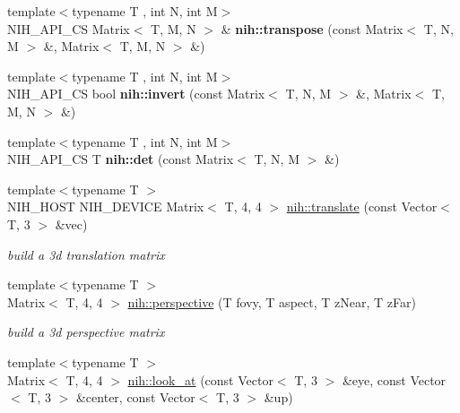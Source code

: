 \begin{DoxyCompactItemize}
\item 
\hypertarget{group__matrices_ga317a79a13fca76856e3c4500ec8eeffa}{
{\footnotesize template$<$typename T , int \-N, int \-M$>$ }\\\-N\-I\-H\-\_\-\-A\-P\-I\-\_\-\-C\-S \-Matrix$<$ \-T, \-M, \-N $>$ \& {\bfseries nih\-::transpose} (const \-Matrix$<$ \-T, \-N, \-M $>$ \&, \-Matrix$<$ \-T, \-M, \-N $>$ \&)}
\label{group__matrices_ga317a79a13fca76856e3c4500ec8eeffa}

\item 
\hypertarget{group__matrices_ga0f2181373ff7ef8ed392ccf8f92b8b97}{
{\footnotesize template$<$typename T , int \-N, int \-M$>$ }\\\-N\-I\-H\-\_\-\-A\-P\-I\-\_\-\-C\-S bool {\bfseries nih\-::invert} (const \-Matrix$<$ \-T, \-N, \-M $>$ \&, \-Matrix$<$ \-T, \-M, \-N $>$ \&)}
\label{group__matrices_ga0f2181373ff7ef8ed392ccf8f92b8b97}

\item 
\hypertarget{group__matrices_ga23f8ea3658a91f52bf853a4865f7df80}{
{\footnotesize template$<$typename T , int \-N, int \-M$>$ }\\\-N\-I\-H\-\_\-\-A\-P\-I\-\_\-\-C\-S \-T {\bfseries nih\-::det} (const \-Matrix$<$ \-T, \-N, \-M $>$ \&)}
\label{group__matrices_ga23f8ea3658a91f52bf853a4865f7df80}

\item 
\hypertarget{group__matrices_ga5d92f3307949b63085b54c2c4d14cb78}{
{\footnotesize template$<$typename T $>$ }\\\-N\-I\-H\-\_\-\-H\-O\-S\-T \-N\-I\-H\-\_\-\-D\-E\-V\-I\-C\-E \-Matrix$<$ \-T, 4, 4 $>$ \hyperlink{group__matrices_ga5d92f3307949b63085b54c2c4d14cb78}{nih\-::translate} (const \-Vector$<$ \-T, 3 $>$ \&vec)}
\label{group__matrices_ga5d92f3307949b63085b54c2c4d14cb78}

\begin{DoxyCompactList}\small\item\em build a 3d translation matrix \end{DoxyCompactList}\item 
\hypertarget{group__matrices_gad1ee54c47ad750f6485c00f707dd978c}{
{\footnotesize template$<$typename T $>$ }\\\-Matrix$<$ \-T, 4, 4 $>$ \hyperlink{group__matrices_gad1ee54c47ad750f6485c00f707dd978c}{nih\-::perspective} (\-T fovy, \-T aspect, \-T z\-Near, \-T z\-Far)}
\label{group__matrices_gad1ee54c47ad750f6485c00f707dd978c}

\begin{DoxyCompactList}\small\item\em build a 3d perspective matrix \end{DoxyCompactList}\item 
\hypertarget{group__matrices_ga9df91e2ecf368ee7e7b9dddce3a7f3d1}{
{\footnotesize template$<$typename T $>$ }\\\-Matrix$<$ \-T, 4, 4 $>$ \hyperlink{group__matrices_ga9df91e2ecf368ee7e7b9dddce3a7f3d1}{nih\-::look\-\_\-at} (const \-Vector$<$ \-T, 3 $>$ \&eye, const \-Vector$<$ \-T, 3 $>$ \&center, const \-Vector$<$ \-T, 3 $>$ \&up)}
\label{group__matrices_ga9df91e2ecf368ee7e7b9dddce3a7f3d1}


\end{DoxyCompactItemize}

